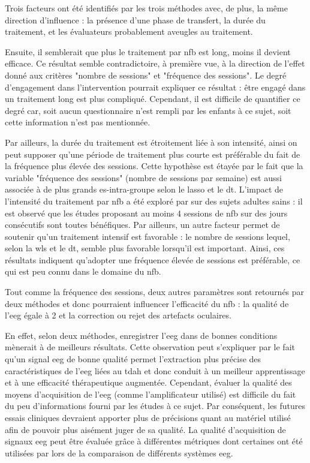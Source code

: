Trois facteurs ont été identifiés par les trois méthodes avec, de plus, la même direction d'influence : la présence d'une phase de transfert, la durée du traitement, et les évaluateurs 
probablement aveugles au traitement. 

Ensuite, il semblerait que plus le traitement par \gls{nfb} est long, moins il devient efficace. Ce résultat semble contradictoire, à première vue, à la direction de l'effet donné
aux critères "nombre de sessions" et "fréquence des sessions". Le degré d'engagement dans l'intervention pourrait expliquer ce
résultat : être engagé dans un traitement long est plus compliqué. Cependant, il est difficile de quantifier ce degré car, soit aucun questionnaire n'est rempli 
par les enfants à ce sujet, soit cette information n'est pas mentionnée. 

Par ailleurs, la durée du traitement est étroitement liée à son intensité, ainsi on peut supposer qu'une période de traitement plus courte est préférable 
du fait de la fréquence plus élevée des sessions. Cette hypothèse est étayée par 
le fait que la variable "fréquence des sessions" (nombre de sessions par semaine) est aussi associée à de plus grands \gls{es}-intra-groupe selon le
\gls{lasso} et le \gls{dt}. L'impact de l'intensité du traitement par \gls{nfb} a été exploré par \citet{Rogala2016} sur des sujets adultes sains : il est
observé que les études proposant au moins 4 sessions de \gls{nfb} sur des jours consécutifs sont toutes bénéfiques. Par ailleurs, un autre facteur permet de soutenir
qu'un traitement intensif est favorable : le nombre de sessions lequel, selon la \gls{wls} et le \gls{dt}, semble plus favorable lorsqu'il 
est important. Ainsi, ces résultats indiquent qu'adopter une fréquence élevée de sessions est préférable, ce qui est peu connu dans le domaine du \gls{nfb}.

Tout comme la fréquence des sessions, deux autres paramètres sont retournés par deux méthodes et donc pourraient influencer l'efficacité du \gls{nfb} : la qualité de l'\gls{eeg}
égale à 2 et la correction ou rejet des artefacts oculaires.

En effet, selon deux méthodes, enregistrer l'\gls{eeg} dans de bonnes conditions mènerait à de meilleurs résultats. Cette observation peut s'expliquer par le fait qu'un signal
\gls{eeg} de bonne qualité permet l'extraction plus précise des caractéristiques de l'\gls{eeg} liées au \gls{tdah} et donc conduit à un meilleur apprentissage et 
à une efficacité thérapeutique augmentée. Cependant, évaluer la qualité des moyens d'acquisition de l'\gls{eeg} (comme l'amplificateur utilisé) 
est difficile du fait du peu d'informations fourni par les études à ce sujet. Par conséquent, les futures essais cliniques devraient apporter plus 
de précisions quant au matériel utilisé afin de pouvoir plus aisément juger de sa qualité. La qualité d'acquisition de signaux \gls{eeg} peut être évaluée grâce à différentes
métriques dont certaines ont été utilisées par \citep{Bussalb2018benchmark} lors de la comparaison de différents systèmes \gls{eeg}. 

